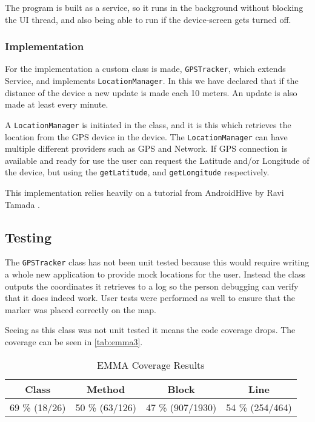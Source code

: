 The program is built as a service, so it runs in the background without blocking the UI thread, and also being able to run if the device-screen gets turned off.

\subsubsection{Implementation}
For the implementation a custom class is made, \texttt{GPSTracker}, which extends Service, and implements \texttt{LocationManager}.
In this we have declared that if the distance of the device a new update is made each 10 meters. An update is also made at least every minute.

A \texttt{LocationManager} is initiated in the class, and it is this which retrieves the location from the \ac{GPS} device in the device. The \texttt{LocationManager} can have multiple different providers such as \ac{GPS} and Network.
If \ac{GPS} connection is available and ready for use the user can request the Latitude and/or Longitude of the device, but using the \texttt{getLatitude}, and \texttt{getLongitude} respectively.

This implementation relies heavily on a tutorial from AndroidHive by Ravi Tamada \citep{androidhive}.

\subsection{Testing}
The \texttt{GPSTracker} class has not been unit tested because this would require writing a whole new application to provide mock locations for the user. Instead the class outputs the coordinates it retrieves to a log so the person debugging can verify that it does indeed work. User tests were performed as well to ensure that the marker was placed correctly on the map.

Seeing as this class was not unit tested it means the code coverage drops. The coverage can be seen in \autoref{tab:emma3}.

\begin{table}[!ht]
	\centering
	\begin{tabular}{| c | c | c | c |}
		\hline
		\textbf{Class} & \textbf{Method} & \textbf{Block} & \textbf{Line} \\ \hline
		69 \% (18/26) & 50 \% (63/126) & 47 \% (907/1930) & 54 \% (254/464) \\
		\hline
	\end{tabular}
	\caption{EMMA Coverage Results}
	\label{tab:emma3}
\end{table}
